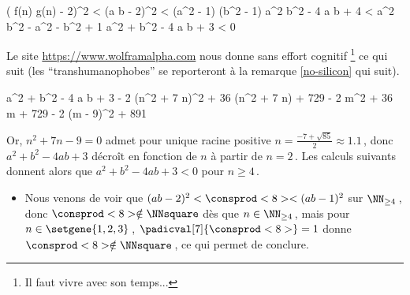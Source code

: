 \begin{itemize}
    \medskip
    \noindent\kern-10pt%
    \begin{stepcalc}[style = ar*, ope={\iff}]
    	\big( f(n) g(n) - 2)^2 < \consprod<8>
    	(a b - 2)^2 < (a^2 - 1) (b^2 - 1)
    \explnext{}
    	a^2 b^2 - 4 a b + 4 < a^2 b^2 - a^2 - b^2 + 1
    \explnext{}
    	a^2 + b^2 - 4 a b + 3 < 0
    \end{stepcalc}

    \medskip
    \noindent
    Le site \url{https://www.wolframalpha.com} nous donne sans effort cognitif
    \footnote{
    	Il faut vivre avec son temps...
    }
    ce qui suit (les \enquote{transhumanophobes} se reporteront à la remarque \ref{no-silicon} qui suit).

    \medskip
    \noindent\kern-10pt%
    \begin{stepcalc}[style = ar*, ope={=}]
    	a^2 + b^2 - 4 a b + 3
    \explnext{}
    	- 2 (n^2 + 7 n)^2 + 36 (n^2 + 7 n) + 729
    	- 2 m^2 + 36 m + 729
    \explnext{}
    	- 2 (m - 9)^2 + 891
    \end{stepcalc}
    
    \medskip
    
    \noindent
    Or, $n^2 + 7 n - 9 = 0$ admet pour unique racine positive $n = \frac{- 7 + \sqrt{85}}{2} \approx \num{1.1}$\,,
    donc $a^2 + b^2 - 4 a b + 3$ décroît en fonction de $n$ à partir de $n = 2$\,. Les calculs suivants donnent alors que $a^2 + b^2 - 4 a b + 3 < 0$ pour $n \geq 4$\,.
\end{itemize}

\begin{center}
\end{center}

\begin{itemize}
	\item Nous venons de voir que $( a b - 2)^2 < \consprod<8> < ( a b - 1)^2$ sur $\NN_{\geq 4}$\,, donc $\consprod<8> \notin \NNsquare$ dès que $n \in \NN_{\geq 4}$\,, mais pour $n \in \setgene{1, 2, 3}$\,, $\padicval[7]{\consprod<8>} =1$ donne $\consprod<8> \notin \NNsquare$\,, ce qui permet de conclure.
		\qedhere
\end{itemize}
